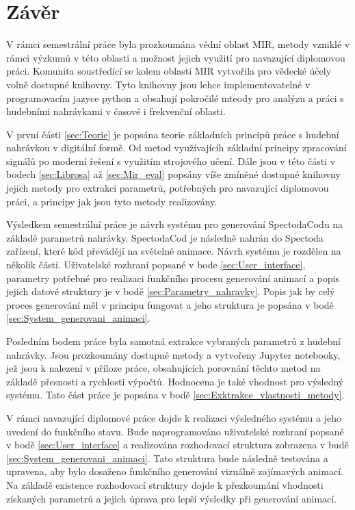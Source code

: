 \chapter*{Závěr}
{}



V rámci semestrální práce byla prozkoumána vědní oblast \acs{MIR}, metody vzniklé v rámci výzkumů v této oblasti a možnost jejich využití pro navazující diplomovou práci. Komunita soustředící se kolem oblasti \acs{MIR} vytvořila pro vědecké účely volně dostupné knihovny. Tyto knihovny jsou lehce implementovatelné v programovacím jazyce python a obsahují pokročilé mteody pro analýzu a práci s hudebními nahrávkami v časové i frekvenční oblasti.

V první části \ref{sec:Teorie} je popsána teorie základních principů práce s hudební nahrávkou v digitální formě. Od metod využívajícíh základní principy zpracování signálů po moderní řešení s využitím strojového učení. Dále jsou v této části v bodech \ref{sec:Librosa} až \ref{sec:Mir_eval} popsány víše zmíněné dostupné knihovny jejich metody pro extrakci parametrů, potřebných pro navazující diplomovou práci, a principy jak jsou tyto metody realizovány.

Výsledkem semestrální práce je návrh systému pro generování SpectodaCodu na základě parametrů nahrávky. SpectodaCod je následně nahrán do Spectoda zařízení, které kód převádějí na světelné animace. Návrh systému je rozdělen na několik částí. Uživatelské rozhraní popsané v bode \ref{sec:User_interface}, parametry potřebné pro realizaci funkčního procesu generování animací a popis jejich datové struktury je v bodě \ref{sec:Parametry_nahravky}. Popis jak by celý proces generování měl v principu fungovat a jeho struktura je popsána v bodě \ref{sec:System_generovani_animaci}.

Posledním bodem práce byla samotná extrakce vybraných parametrů z hudební nahrávky. Jsou prozkoumány dostupné metody a vytvořeny Jupyter notebooky, jež jsou k nalezení v příloze práce, obsahujících porovnání těchto metod na základě přesnosti a rychlosti výpočtů. Hodnocena je také vhodnost pro výsledný systému. Tato část práce je popsána v bodě \ref{sec:Exktrakce_vlastnosti_metody}.

V rámci navazující diplomové práce dojde k realizaci výsledného systému a jeho uvedení do funkčního stavu. Bude naprogramováno uživatelské rozhraní popsané v bodě \ref{sec:User_interface} a realizována rozhodovací struktura zobrazena v budě \ref{sec:System_generovani_animaci}. Tato struktura bude následně testována a upravena, aby bylo dosaženo funkčního generování vizuálně zajímavých animací. Na základě existence rozhodovací struktury dojde k přezkoumání vhodnosti získaných parametrů a jejich úprava pro lepší výsledky při generování animací. 


